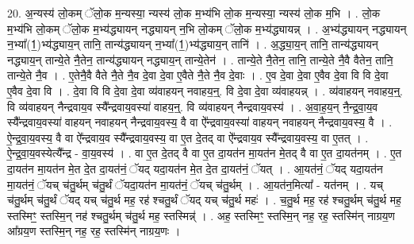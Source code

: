 \documentclass[17pt]{extarticle}
\begin{document}
20. अ॒न्यस्य॑ लो॒कम् ॅलो॒क म॒न्यस्या॒ न्यस्य॑ लो॒क म॒भ्य॑भि लो॒क म॒न्यस्या॒ न्यस्य॑ लो॒क म॒भि । . लो॒क म॒भ्य॑भि लो॒कम् ॅलो॒क म॒भ्य॑द्ध्यायन् नद्ध्यायन् न॒भि लो॒कम् ॅलो॒क म॒भ्य॑द्ध्यायन्न् । . अ॒भ्य॑द्ध्यायन् नद्ध्यायन् न॒भ्या᳚(1॒)भ्य॑द्ध्याय॒न् तानि॒ तान्य॑द्ध्यायन् न॒भ्या᳚(1॒)भ्य॑द्ध्याय॒न् तानि॑ । . अ॒द्ध्या॒य॒न् तानि॒ तान्य॑द्ध्यायन् नद्ध्याय॒न् तान्ये॒ते नै॒तेन॒ तान्य॑द्ध्यायन् नद्ध्याय॒न् तान्ये॒तेन॑ । . तान्ये॒ते नै॒तेन॒ तानि॒ तान्ये॒ते नै॒वै वैतेन॒ तानि॒ तान्ये॒ते नै॒व । . ए॒तेनै॒वै वैते नै॒ते नै॒व दे॒वा दे॒वा ए॒वैते नै॒ते नै॒व दे॒वाः । . ए॒व दे॒वा दे॒वा ए॒वैव दे॒वा वि वि दे॒वा ए॒वैव दे॒वा वि । . दे॒वा वि वि दे॒वा दे॒वा व्य॑वाहयन् नवाहय॒न्॒. वि दे॒वा दे॒वा व्य॑वाहयन्न् । . व्य॑वाहयन् नवाहय॒न्॒. वि व्य॑वाहयन् नैन्द्रवाय॒व स्यै᳚न्द्रवाय॒वस्या॑ वाहय॒न्॒. वि व्य॑वाहयन् नैन्द्रवाय॒वस्य॑ । . अ॒वा॒ह॒य॒न् नै॒न्द्र॒वा॒य॒व स्यै᳚न्द्रवाय॒वस्या॑ वाहयन् नवाहयन् नैन्द्रवाय॒वस्य॒ वै वा ऐ᳚न्द्रवाय॒वस्या॑ वाहयन् नवाहयन् नैन्द्रवाय॒वस्य॒ वै । . ऐ॒न्द्र॒वा॒य॒वस्य॒ वै वा ऐ᳚न्द्रवाय॒व स्यै᳚न्द्रवाय॒वस्य॒ वा ए॒त दे॒तद् वा ऐ᳚न्द्रवाय॒व
स्यै᳚न्द्रवाय॒वस्य॒ वा ए॒तत् । . ऐ॒न्द्र॒वा॒य॒वस्येत्यै᳚न्द्र - वा॒य॒वस्य॑ । . वा ए॒त दे॒तद् वै वा ए॒त दा॒यत॑न मा॒यत॑न मे॒तद् वै वा ए॒त दा॒यत॑नम् । . ए॒त दा॒यत॑न मा॒यत॑न मे॒त दे॒त दा॒यत॑नं॒ ॅयद् यदा॒यत॑न मे॒त दे॒त दा॒यत॑नं॒ ॅयत् । . आ॒यत॑नं॒ ॅयद् यदा॒यत॑न मा॒यत॑नं॒ ॅयच् च॑तु॒र्थम् च॑तु॒र्थं ॅयदा॒यत॑न मा॒यत॑नं॒ ॅयच् च॑तु॒र्थम् । . आ॒यत॑न॒मित्या᳚ - यत॑नम् । . यच् च॑तु॒र्थम् च॑तु॒र्थं ॅयद् यच् च॑तु॒र्थ मह॒ रह॑ श्चतु॒र्थं ॅयद् यच् च॑तु॒र्थ महः॑ । . च॒तु॒र्थ मह॒ रह॑ श्चतु॒र्थम् च॑तु॒र्थ मह॒ स्तस्मिꣳ॒॒ स्तस्मि॒न् नह॑ श्चतु॒र्थम् च॑तु॒र्थ मह॒ स्तस्मिन्न्॑ । . अह॒ स्तस्मिꣳ॒॒ स्तस्मि॒न् नह॒ रह॒ स्तस्मि॑न् नाग्रय॒ण आ᳚ग्रय॒ण स्तस्मि॒न् नह॒ रह॒ स्तस्मि॑न् नाग्रय॒णः । \newline
\end{document}
